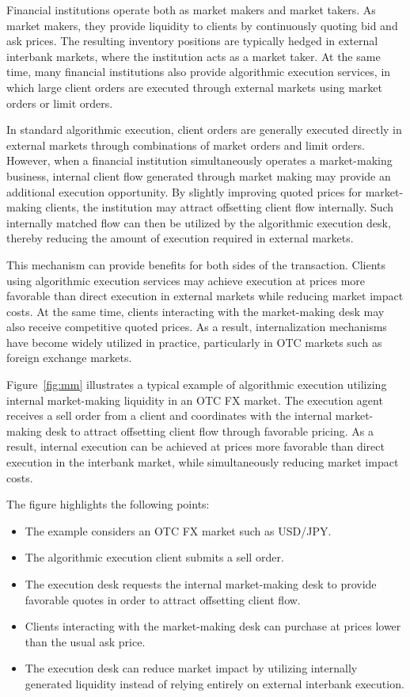 \documentclass[12pt]{article}
\begin{document}
Financial institutions operate both as market makers and market takers. 
As market makers, they provide liquidity to clients by continuously quoting bid and ask prices. 
The resulting inventory positions are typically hedged in external interbank markets, where the institution acts as a market taker. 
At the same time, many financial institutions also provide algorithmic execution services, in which large client orders are executed through external markets using market orders or limit orders.

In standard algorithmic execution, client orders are generally executed directly in external markets through combinations of market orders and limit orders. 
However, when a financial institution simultaneously operates a market-making business, internal client flow generated through market making may provide an additional execution opportunity. 
By slightly improving quoted prices for market-making clients, the institution may attract offsetting client flow internally. 
Such internally matched flow can then be utilized by the algorithmic execution desk, thereby reducing the amount of execution required in external markets.

This mechanism can provide benefits for both sides of the transaction. 
Clients using algorithmic execution services may achieve execution at prices more favorable than direct execution in external markets while reducing market impact costs. 
At the same time, clients interacting with the market-making desk may also receive competitive quoted prices. 
As a result, internalization mechanisms have become widely utilized in practice, particularly in OTC markets such as foreign exchange markets.

Figure~\ref{fig:mm} illustrates a typical example of algorithmic execution utilizing internal market-making liquidity in an OTC FX market. 
The execution agent receives a sell order from a client and coordinates with the internal market-making desk to attract offsetting client flow through favorable pricing. 
As a result, internal execution can be achieved at prices more favorable than direct execution in the interbank market, while simultaneously reducing market impact costs.

The figure highlights the following points:
\begin{itemize}
  \item The example considers an OTC FX market such as USD/JPY.
  \item The algorithmic execution client submits a sell order.
  \item The execution desk requests the internal market-making desk to provide favorable quotes in order to attract offsetting client flow.
  \item Clients interacting with the market-making desk can purchase at prices lower than the usual ask price.
  \item The execution desk can reduce market impact by utilizing internally generated liquidity instead of relying entirely on external interbank execution.
\end{itemize}
\end{document}
